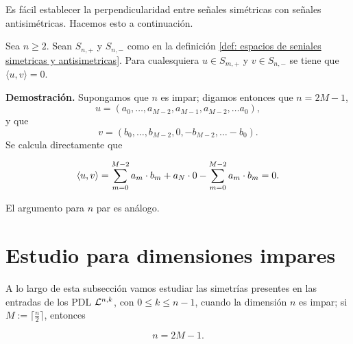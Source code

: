 Es fácil establecer la perpendicularidad entre
señales simétricas con señales antisimétricas.
Hacemos esto a continuación.

\begin{lema}
\label{lema: ortogonalidad entre sim y antisim}
Sea $n \geq 2$.
Sean $S_{n,+}$ y $S_{n,-}$ como en la definición
\ref{def: espacios de seniales simetricas y antisimetricas}.
Para cualesquiera 
$u \in S_{m,+}$ y $v \in S_{n,-}$ se tiene que
$\langle u, v \rangle=0$.
\end{lema}
\noindent
\textbf{Demostración.}
Supongamos que $n$ es impar; digamos entonces que
$n = 2M-1$, 
\begin{equation*}
u=(a_{0}, \ldots , a_{M-2}, a_{M-1}, a_{M-2}, \ldots a_{0}),
\end{equation*}
y que 
\begin{equation*}
v=(b_{0}, \ldots , b_{M-2}, 0, -b_{M-2}, \ldots -b_{0}).
\end{equation*}
Se calcula directamente que 

\[
\langle u, v \rangle = \sum\limits_{m=0}^{M-2}a_{m} \cdot b_{m} + a_{N} \cdot 0
-\sum\limits_{m=0}^{M-2}a_{m} \cdot b_{m} =0.
\]

\noindent
El argumento para $n$ par es análogo.
\QEDB
\vspace{0.2cm}

\section{Estudio para dimensiones impares}
A lo largo de esta subsección vamos 
estudiar las simetrías presentes en las entradas
de los PDL $\mathcal{L}^{n,k}$, con $0 \leq k \leq n-1$,
cuando la dimensión $n$ es impar;
si $M := \lceil \frac{n}{2} \rceil$,
entonces

\begin{equation}
\label{eq1: 19En}
n=2M - 1.
\end{equation}

